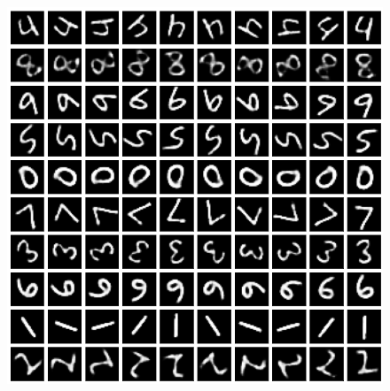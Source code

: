 \begin{frame}
\begin{figure}[h!]
\begin{minipage}{0.32\textwidth}
		\end{minipage}
		\begin{minipage}{0.32\textwidth}
			\includegraphics[scale=0.12]{Bilder/rotatingMNIST_VAElat2}
		\end{minipage}
		

\end{figure}
\end{frame}
